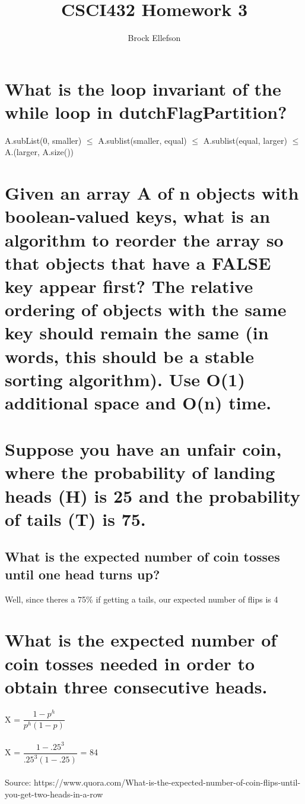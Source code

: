 \documentclass[10pt,letterpaper]{article}
\author{Brock Ellefson}
\title{CSCI432 Homework 3}
\begin{document}
\maketitle
\section{What is the loop invariant of the while loop in dutchFlagPartition?}
A.subList(0, smaller) $\leq$ A.sublist(smaller, equal) $\leq$ A.sublist(equal, larger) $\leq$ A.(larger, A.size())

\section{Given an array A of n objects
with boolean-valued keys, what is an algorithm to reorder
the array so that objects that have a FALSE key
appear first? The relative ordering of objects with
the same key should remain the same (in words, this
should be a stable sorting algorithm). Use O(1) additional
space and O(n) time.}

\begin{algorithmic}
	\ENDIF
\ENDFOR
\end{algorithmic}


\section{Suppose you have an unfair
coin, where the probability of landing heads (H) is
25 and the probability of tails (T) is 75.}

\subsection{What is the expected number of coin tosses until one head
turns up?}

Well, since theres a 75\% if getting a tails, our expected number of flips is 4 

\section{What is the expected number of coin tosses
needed in order to obtain three consecutive heads.}

X = $\dfrac{1-p^{h}}{p^{h}(1-p)}$\\\\
X = $\dfrac{1-.25^{3}}{.25^{3}(1-.25)}$ = 84\\\\
Source: https://www.quora.com/What-is-the-expected-number-of-coin-flips-until-you-get-two-heads-in-a-row
\end{document}
